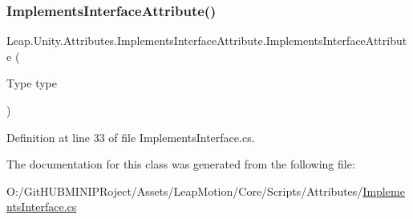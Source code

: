 \subsubsection{\texorpdfstring{ImplementsInterfaceAttribute()}{ImplementsInterfaceAttribute()}}
{\footnotesize\ttfamily Leap.\+Unity.\+Attributes.\+Implements\+Interface\+Attribute.\+Implements\+Interface\+Attribute (\begin{DoxyParamCaption}\item[{Type}]{type }\end{DoxyParamCaption})}



Definition at line 33 of file Implements\+Interface.\+cs.



The documentation for this class was generated from the following file\+:\begin{DoxyCompactItemize}
\item 
O\+:/\+Git\+H\+U\+B\+M\+I\+N\+I\+P\+Roject/\+Assets/\+Leap\+Motion/\+Core/\+Scripts/\+Attributes/\mbox{\hyperlink{_implements_interface_8cs}{Implements\+Interface.\+cs}}\end{DoxyCompactItemize}
